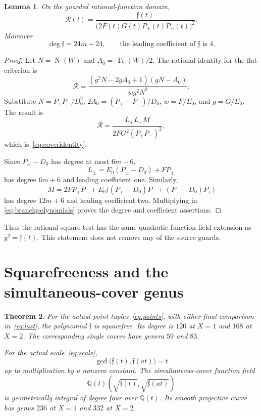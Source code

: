 \documentclass[11pt,a4paper]{article}
\newtheorem{theorem}{Theorem}[section]
\newtheorem{lemma}[theorem]{Lemma}
\newcommand{\Q}{\mathbb Q}
\DeclareMathOperator{\Tr}{Tr}\DeclareMathOperator{\Nm}{N}
\begin{document}
\begin{lemma}\label{lem:identity}
On the guarded rational-function domain,
\begin{equation}\label{eq:coveridentity}
         \mathcal R(t)=
          \frac{\mathfrak f(t)}
               {\bigl(2F(t)G(t)P_+(t)P_-(t)\bigr)^2}.
\end{equation}
Moreover
\[
 \deg\mathfrak f=24m+24,\qquad
                  \text{the leading coefficient of }\mathfrak f\text{ is }4.
\]
\end{lemma}
\begin{proof}
Let $N=\Nm(W)$ and $A_0=\Tr(W)/2$. The rational identity for the
flat criterion is
\[
 \mathcal R=
 \frac{(g^2N-2gA_0+1)(gN-A_0)}{wg^2N^2}.
\]
Substitute $N=P_+P_-/D_0^2$, $2A_0=(P_++P_-)/D_0$,
$w=F/E_0$, and $g=G/E_0$. The result is
\[
 \mathcal R=
 \frac{L_+L_-M}{2FG^2(P_+P_-)^2},
\]
which is~\eqref{eq:coveridentity}.

Since $P_\pm-D_0$ has degree at most $6m-6$,
\[
 L_\pm=E_0(P_\pm-D_0)+FP_\pm
\]
has degree $6m+6$ and leading coefficient one. Similarly,
\[
 M=2FP_+P_-+E_0\bigl((P_+-D_0)P_-+(P_--D_0)P_+\bigr)
\]
has degree $12m+6$ and leading coefficient two. Multiplying in
\eqref{eq:branchpolynomials} proves the degree and coefficient
assertions.
\end{proof}

Thus the rational square test has the same quadratic function-field
extension as $y^2=\mathfrak f(t)$. This statement does not remove
any of the source guards.

\section{Squarefreeness and the simultaneous-cover genus}

\begin{theorem}\label{thm:genera}
For the actual point tuples~\eqref{eq:points}, with either final
comparison in~\eqref{eq:last}, the polynomial $\mathfrak f$ is
squarefree. Its degree is $120$ at $X=1$ and $168$ at $X=2$.
The corresponding single covers have genera $59$ and $83$.

For the actual scale~\eqref{eq:scale},
\[
            \gcd\bigl(\mathfrak f(t),\mathfrak f(at)\bigr)=t
\]
up to multiplication by a nonzero constant. The simultaneous-cover
function field
\[
 \Q(t)\left(\sqrt{\mathfrak f(t)},\sqrt{\mathfrak f(at)}\right)
\]
is geometrically integral of degree four over $\Q(t)$. Its smooth
projective curve has genus $236$ at $X=1$ and $332$ at $X=2$.
\end{theorem}
\end{document}
